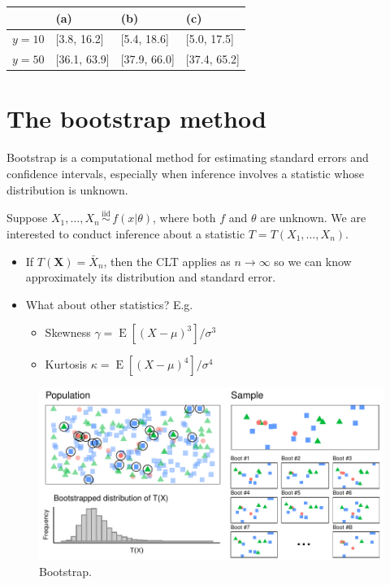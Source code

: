 \documentclass[
]{book}
\providecommand{\tightlist}{%
  \setlength{\itemsep}{0pt}\setlength{\parskip}{0pt}}
\newcommand{\bX}{{\boldsymbol X}}
\DeclareMathOperator{\E}{E}
\newcommand{\iid}{\,\overset{\text{iid}}{\sim}\,}
\theoremstyle{definition}
\theoremstyle{definition}
\theoremstyle{definition}
\theoremstyle{definition}
\theoremstyle{remark}
\begin{document}
\begin{longtable}[]{@{}llll@{}}
\toprule
& (a) & (b) & (c) \\
\midrule
\endhead
\(y=10\) & {[}3.8, 16.2{]} & {[}5.4, 18.6{]} & {[}5.0, 17.5{]} \\
\(y=50\) & {[}36.1, 63.9{]} & {[}37.9, 66.0{]} & {[}37.4, 65.2{]} \\
\bottomrule
\end{longtable}

\hypertarget{the-bootstrap-method}{%
\section{The bootstrap method}\label{the-bootstrap-method}}

Bootstrap is a computational method for estimating standard errors and confidence intervals, especially when inference involves a statistic whose distribution is unknown.

Suppose \(X_1,\dots,X_n\iid f(x|\theta)\), where both \(f\) and \(\theta\) are unknown. We are interested to conduct inference about a statistic \(T=T(X_1,\dots,X_n)\).

\begin{itemize}
\item
  If \(T(\bX)=\bar X_n\), then the CLT applies as \(n\to\infty\) so we can know approximately its distribution and standard error.
\item
  What about other statistics? E.g.

  \begin{itemize}
  \tightlist
  \item
    Skewness \(\gamma=\E\left[(X-\mu)^3 \right]/\sigma^3\)
  \item
    Kurtosis \(\kappa=\E\left[(X-\mu)^4 \right]/\sigma^4\)
  \end{itemize}
\end{itemize}

\begin{figure}

{\centering \includegraphics[width=0.9\linewidth]{figure/bootstrap} 

}

\caption{Bootstrap.}\label{fig:bootstrap}
\end{figure}
\end{document}
